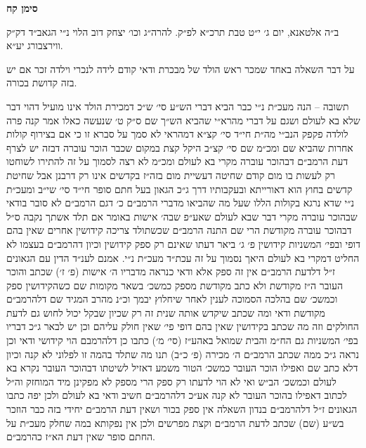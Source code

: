 \documentclass[12pt, openany]{book}
\newcommand{\chapname}{}
\newcommand{\newchap}[1]{
	\addcontentsline{toc}{chapter}{#1}
	\renewcommand{\chapname}{#1}
		\begin{center}
			\textbf{%
\fontsize{16pt}{16pt}\selectfont
				#1}
		\end{center}
}
\begin{document}
\newchap{סימן קח}
\begin{multicols}{2}
ב״ה אלטאנא, יום ג׳ י״ט טבת תרכ״א לפ״ק. להרה״ג וכו׳ יצחק דוב הלוי נ״י הגאב״ד דק״ק ווירצבורג יע״א.\\\vspace{0pt}

על דבר השאלה באחד שמכר ראש הולד של מבכרת ודאי קודם לידה לנכרי וילדה זכר אם יש בזה קדושת בכורה.\\\vspace{0pt}

תשובה – הנה מעכ״ת נ״י כבר הביא דברי הש״ע סי׳ ש״כ דמכירת הולד אינו מועיל דהוי דבר שלא בא לעולם ושגם על דברי מהרא״י שהביא הש״ך שם ס״ק ט׳ שנעשה כאלו אמר קנה פרה לולדה פקפק הנב״י מה״ת חי״ד סי׳ קצ״א דמהראי לא סמך על סברא זו כי אם בצירוף קולות אחרות שהביא שם ומכ״מ שם סי׳ קצ״ב היקל קצת במקום שכבר הוכר עוברה דבזה יש לצרף דעת הרמב״ם דבהוכר עוברה מקרי בא לעולם ומכ״מ לא רצה לסמוך על זה להתירו לשוחטו רק לעשות בו מום קודם שחיטה דעשיית מום בזה״ז בקדשים אינו רק דרבנן אבל שחיטת קדשים בחוץ הוא דאורייתא ובעקבותיו דרך ג״כ הגאון בעל חתם סופר חי״ד סי׳ שי״ב ומעכ״ת נ״י שדא נרגא בקולות הללו שעל מה שהביאו מדברי הרמב״ם כ׳ דגם הרמב״ם לא סובר בודאי שבהוכר עוברה מקרי דבר שבא לעולם שאע״פ שבה׳ אישות באומר אם תלד אשתך נקבה ס״ל דבהוכר עוברה מקודשת הרי שם התנה הרמב״ם שכשתולד צריכה קידושין אחרים שאין בהם דופי ובפי׳ המשניות קידושין פ׳ ג׳ ביאר דעתו שאינם רק ספק קידושין וכיון דהרמב״ם בעצמו לא החליט דמקרי בא לעולם היאך נסמוך על זה עכת״ד מעכ״ת נ״י. אמנם לענ״ד הדין עם הגאונים ז״ל דלדעת הרמב״ם אין זה ספק אלא ודאי כנראה מדבריו ה׳ אישות (פ׳ ז׳) שכתב והוכר העובר ה״ז מקודשת ולא כתב מקודשת מספק כמשכ׳ בשאר מקומות שם כשהקידושין ספק וכמשכ׳ שם בהלכה הסמוכה לענין לאחר שיחלוץ יבמך וכ״נ מהרב המגיד שם דלהרמב״ם מקודשת ודאי ומה שכתב שיקדש אותה שנית זה רק שכיון שבקל יכול לחוש גם לדעת החולקים וזה מה שכתב בקידושין שאין בהם דופי פי׳ שאין חולק עליהם וכן יש לבאר ג״כ דבריו בפי׳ המשניות גם הח״מ והבית שמואל באהע״ז (סי׳ מ׳) כתבו כן דלהרמבם הוי קידושי ודאי וכן נראה ג״כ ממה שכתב הרמב״ם ה׳ מכירה (פ׳ כ״ב) תנו מה שתלד בהמה זו לפלוני לא קנה וכיון דלא כתב שם ואפילו הוכר העובר כמשכ׳ הטור משמע דאזיל לשיטתו דבהוכר העובר נקרא בא לעולם וכמשכ׳ הב״ש ואי לא הוי לדעתו רק ספק הרי מספק לא מפקינן מיד המוחזק וה״ל לכתוב דאפילו בהוכר העובר לא קנה אע״כ דלהרמב״ם חשיב ודאי בא לעולם ולכן יפה כתבו הגאונים ז״ל דלהרמב״ם בנדון השאלה אין ספק בכור ושאין דעת הרמב״ם יחידי בזה כבר הוזכר בש״ע (שם) שכתב לדעת הרמב״ם וקצת מפרשים ולכן אין נפקותא במה שחלק מעכ״ת על החתם סופר שאין דעת הא״ז כהרמב״ם.\\\vspace{0pt}


\end{multicols}
\end{document}
